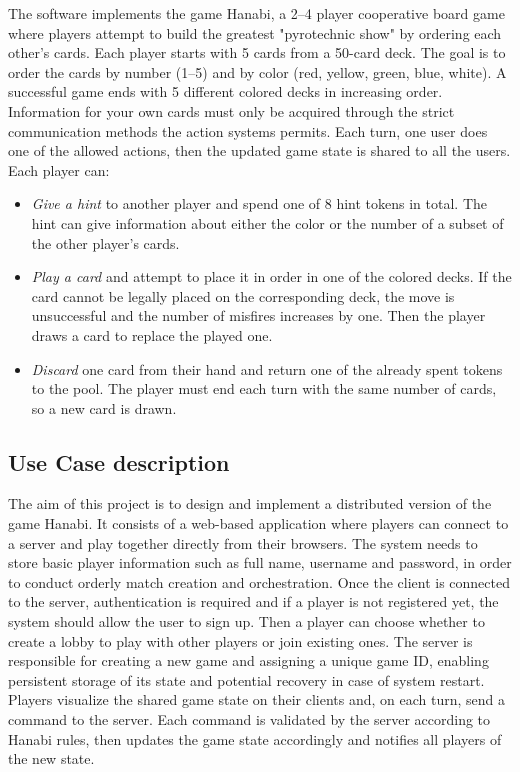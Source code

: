 \documentclass{scrartcl}
\begin{document}
The software implements the game Hanabi, a 2--4 player cooperative board game where players attempt to build the greatest "pyrotechnic show" by ordering each other's cards.
Each player starts with 5 cards from a 50-card deck. The goal is to order the cards by number (1--5) and by color (red, yellow, green, blue, white).
A successful game ends with 5 different colored decks in increasing order. 
Information for your own cards must only be acquired through the strict communication methods the action systems permits.
Each turn, one user does one of the allowed actions, then the updated game state is shared to all the users. 
Each player can:
    \begin{itemize}
        \item \emph{Give a hint} to another player and spend one of 8 hint tokens in total. The hint can give information about either the color or the number of a subset of the other player's cards. 
        \item \emph{Play a card} and attempt to place it in order in one of the colored decks. If the card cannot be legally placed on the corresponding deck, the move is unsuccessful and the number of misfires increases by one. Then the player draws a card to replace the played one.
        \item \emph{Discard} one card from their hand and return one of the already spent tokens to the pool. The player must end each turn with the same number of cards, so a new card is drawn. 
    \end{itemize}


\subsection{Use Case description}
The aim of this project is to design and implement a distributed version of the game Hanabi.
It consists of a web-based application where players can connect to a server and play together directly from their browsers. 
The system needs to store basic player information such as full name, username and password, in order to conduct orderly match creation and orchestration.
Once the client is connected to the server, authentication is required and if a player is not registered yet, the system should allow the user to sign up.
Then a player can choose whether to create a lobby to play with other players or join existing ones.
The server is responsible for creating a new game and assigning a unique game ID, enabling persistent storage of its state and potential recovery in case of system restart.
Players visualize the shared game state on their clients and, on each turn, send a command to the server. Each command is validated by the server according to Hanabi rules, then updates the game state accordingly and notifies all players of the new state.
\end{document}
